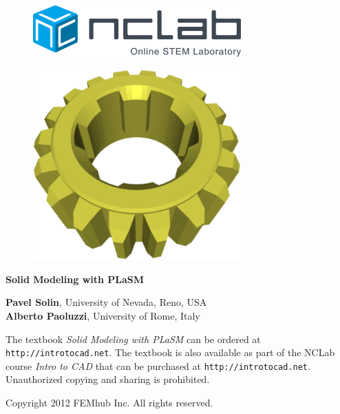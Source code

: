 \documentclass{article}
\newif\iffullversion
\begin{document}
\large

\vbox{}
\begin{figure}[!ht]
\includegraphics[width=8cm]{img/logo.png}
\vspace{18mm}
\end{figure}

\begin{figure}[!ht]
\begin{center}
\includegraphics[width=8cm]{img/plasm-frontpage.png}
\vspace{16mm}
\end{center}
\end{figure}

\begin{center}
{\Huge \bf Solid Modeling with PLaSM}\\
\vbox{}
\vspace{1.4cm}
\iffullversion
\else
\centerline{\huge \color{red}{PREVIEW}}
\fi
\vfill
\vbox{}
\vspace{1cm}
\vfill
{\large
{\bf Pavel Solin}, University of Nevada, Reno, USA\\
{\bf Alberto Paoluzzi}, University of Rome, Italy
}
\end{center}
\newpage



\vbox{}
\vfill
\begin{center}
{
The textbook {\em Solid Modeling with PLaSM} 
can be ordered at {\tt http://introtocad.net}. The textbook 
is also available as part of the NCLab course {\em Intro to CAD} 
that can be purchased at {\tt http://introtocad.net}.
Unauthorized copying and sharing is prohibited.
}
\vfill

Copyright 2012 FEMhub Inc. All rights reserved.
\end{center}
\end{document}
